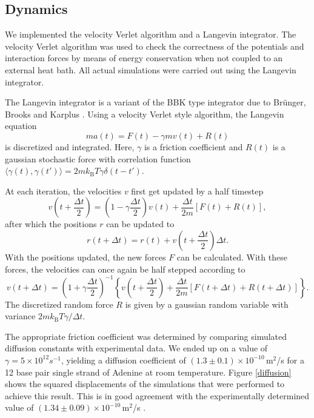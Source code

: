 \subsection{Dynamics}
We implemented the velocity Verlet algorithm and a Langevin integrator. The velocity Verlet algorithm was used to check the correctness of the potentials and interaction forces by means of energy conservation when not coupled to an external heat bath. All actual simulations were carried out using the Langevin integrator.

The Langevin integrator is a variant of the BBK type integrator due to Br{\"u}nger, Brooks and Karplus \cite{brunger1984stochastic}. Using a velocity Verlet style algorithm, the Langevin equation
\begin{equation}
m a(t) = F(t) - \gamma m v(t) + R(t)
\end{equation}
is discretized and integrated. Here, $\gamma$ is a friction coefficient and $R(t)$ is a gaussian stochastic force with correlation function $\langle\gamma(t), \gamma(t')\rangle = 2 m k_\text{B} T \gamma \delta(t-t')$.

At each iteration, the velocities $v$ first get updated by a half timestep
\begin{equation}
v\left(t + \frac{\Delta t}{2}\right)
= \left(1 - \gamma\frac{\Delta t}{2}\right) v(t)
	+ \frac{\Delta t}{2m} [F(t) + R(t)],
\end{equation}
after which the positions $r$ can be updated to
\begin{equation}
r(t + \Delta t)
= r(t) + v\left(t + \frac{\Delta t}{2}\right) \Delta t.
\end{equation}
With the positions updated, the new forces $F$ can be calculated. With these forces, the velocities can once again be half stepped according to
\begin{equation}
v(t + \Delta t) = \left(1 + \gamma \frac{\Delta t}{2}\right)^{-1}
\left\{
	v\left(t + \frac{\Delta t}{2}\right)
	+ \frac{\Delta t}{2m} \left[
			F(t + \Delta t) + R(t + \Delta t)
	\right]
\right\}.
\end{equation}
The discretized random force $R$ is given by a gaussian random variable with variance $2 m k_\text{B} T \gamma / \Delta t$.

The appropriate friction coefficient was determined by comparing simulated diffusion constants with experimental data. We ended up on a value of $\gamma = 5 \times 10^{12} s^{-1}$, yielding a diffusion coefficient of $(1.3 \pm 0.1) \times 10^{-10}$\,m$^2$/s for a 12 base pair single strand of Adenine at room temperature.  Figure \ref{diffusion} shows the squared displacements of the simulations that were performed to achieve this result. This is in good agreement with the experimentally determined value of $(1.34 \pm 0.09) \times 10^{-10}$\,m$^2$/s \cite{stellwagen2001measuring, bonifacio1997comparison, eimer1991rotational}. 


